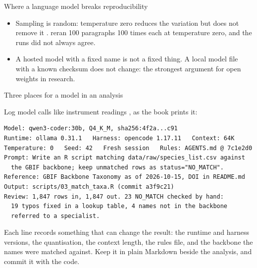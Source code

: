 \documentclass[11pt,aspectratio=169]{beamer}
\begin{document}
\begin{frame}{Where a language model breaks reproducibility}
  \begingroup{}\endgroup
  \begin{itemize}
    \item Sampling is random: temperature zero reduces the variation but
      does not remove it \parencite{coqueret2026randomness}.
      \textcite{keck2026interactions} reran 100 paragraphs 100 times each
      at temperature zero, and the runs did not always agree.
    \item A hosted model with a fixed name is not a fixed thing. A local
      model file with a known checksum does not change: the strongest
      argument for open weights in research.
  \end{itemize}
\end{frame}

\begin{frame}{Three places for a model in an analysis}
  \begingroup{}\endgroup
\end{frame}

\begin{frame}[fragile]{Log model calls like instrument readings}
  , as the book prints it:
\begin{lstlisting}
Model: qwen3-coder:30b, Q4_K_M, sha256:4f2a...c91
Runtime: ollama 0.31.1   Harness: opencode 1.17.11   Context: 64K
Temperature: 0   Seed: 42   Fresh session   Rules: AGENTS.md @ 7c1e2d0
Prompt: Write an R script matching data/raw/species_list.csv against
  the GBIF backbone; keep unmatched rows as status="NO_MATCH".
Reference: GBIF Backbone Taxonomy as of 2026-10-15, DOI in README.md
Output: scripts/03_match_taxa.R (commit a3f9c21)
Review: 1,847 rows in, 1,847 out. 23 NO_MATCH checked by hand:
  19 typos fixed in a lookup table, 4 names not in the backbone
  referred to a specialist.
\end{lstlisting}
  Each line records something that can change the result: the runtime and
  harness versions, the quantisation, the context length, the rules file,
  and the backbone the names were matched against. Keep it in plain
  Markdown beside the analysis, and commit it with the code.
\end{frame}
\end{document}
